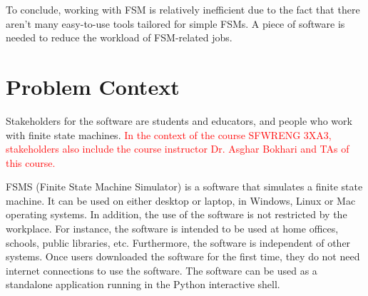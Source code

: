 \documentclass{article}
\begin{document}
To conclude, working with FSM is relatively inefficient due to the fact that
there aren't many easy-to-use tools tailored for simple FSMs. A piece of
software is needed to reduce the workload of FSM-related jobs.

\section{Problem Context}

Stakeholders for the software are students and educators, and people who work
with finite state machines. \textcolor{red}{In the context of the course SFWRENG
3XA3, stakeholders also include the course instructor Dr. Asghar Bokhari and TAs
of this course.}

FSMS (Finite State Machine Simulator) is a software that simulates a finite
state machine. It can be used on either desktop or laptop, in Windows, Linux or
Mac operating systems. In addition, the use of the software is not restricted by
the workplace. For instance, the software is intended to be used at home
offices, schools, public libraries, etc. Furthermore, the software is
independent of other systems. Once users downloaded the software for the first
time, they do not need internet connections to use the software. The software
can be used as a standalone application running in the Python interactive shell.
\end{document}
